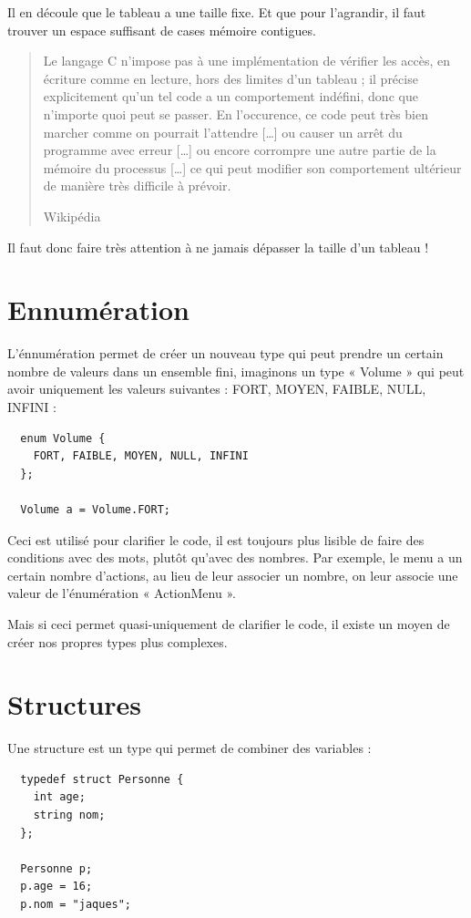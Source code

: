 Il en découle que le tableau a une taille fixe. Et que pour l'agrandir, il faut trouver un espace suffisant de cases mémoire contigues.

\begin{quotation}
  Le langage C n'impose pas à une implémentation de vérifier les accès, en écriture comme en lecture, hors des limites d'un tableau ; il précise explicitement qu'un tel code a un comportement indéfini, donc que n'importe quoi peut se passer. En l'occurence, ce code peut très bien marcher comme on pourrait l'attendre […] ou causer un arrêt du programme avec erreur […] ou encore corrompre une autre partie de la mémoire du processus […] ce qui peut modifier son comportement ultérieur de manière très difficile à prévoir.
  \begin{flushright}
    Wikipédia
  \end{flushright}
\end{quotation}

Il faut donc faire très attention à ne jamais dépasser la taille d'un tableau !


\section{Ennumération}
L'énnumération permet de créer un nouveau type qui peut prendre 
un certain nombre de valeurs dans un ensemble fini, imaginons un type « Volume » 
qui peut avoir uniquement les valeurs suivantes : FORT, MOYEN, FAIBLE, NULL, INFINI : 

\begin{lstlisting} 
  enum Volume {
    FORT, FAIBLE, MOYEN, NULL, INFINI
  };
  
  Volume a = Volume.FORT;
\end{lstlisting}

Ceci est utilisé pour clarifier le code, il est toujours plus lisible de faire des conditions avec des mots, plutôt qu'avec des nombres.
Par exemple, le menu a un certain nombre d'actions, au lieu de leur associer un nombre, on leur associe une valeur de l'énumération « ActionMenu ».

Mais si ceci permet quasi-uniquement de clarifier le code, il existe un moyen de créer nos propres types plus complexes.

\section{Structures}
\label{DefStruct}
Une structure est un type qui permet de combiner des variables : 
\begin{lstlisting}
  typedef struct Personne {
    int age;
    string nom;
  };
  
  Personne p;
  p.age = 16;
  p.nom = "jaques";
\end{lstlisting}

